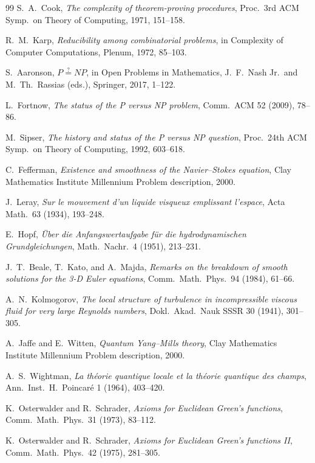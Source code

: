 \documentclass[11pt,a4paper]{amsart}
\theoremstyle{plain}
\theoremstyle{definition}
\begin{document}
\begin{thebibliography}{99}
 S.~A.~Cook, \emph{The complexity of theorem-proving
procedures}, Proc.~3rd ACM Symp.~on Theory of Computing, 1971, 151--158.

 R.~M.~Karp, \emph{Reducibility among combinatorial
problems}, in Complexity of Computer Computations, Plenum, 1972, 85--103.

 S.~Aaronson, \emph{$P\stackrel{?}{=}NP$}, in Open
Problems in Mathematics, J.~F.~Nash Jr.~and M.~Th.~Rassias (eds.),
Springer, 2017, 1--122.

 L.~Fortnow, \emph{The status of the P versus NP
problem}, Comm.~ACM 52 (2009), 78--86.

 M.~Sipser, \emph{The history and status of the P
versus NP question}, Proc.~24th ACM Symp.~on Theory of Computing, 1992,
603--618.

 C.~Fefferman, \emph{Existence and smoothness of
the Navier--Stokes equation}, Clay Mathematics Institute Millennium
Problem description, 2000.

 J.~Leray, \emph{Sur le mouvement d'un liquide
visqueux emplissant l'espace}, Acta Math.~63 (1934), 193--248.

 E.~Hopf, \emph{\"Uber die Anfangswertaufgabe f\"ur
die hydrodynamischen Grundgleichungen}, Math.~Nachr.~4 (1951), 213--231.

 J.~T.~Beale, T.~Kato, and A.~Majda, \emph{Remarks on
the breakdown of smooth solutions for the 3-D Euler equations},
Comm.~Math.~Phys.~94 (1984), 61--66.

 A.~N.~Kolmogorov, \emph{The local structure of
turbulence in incompressible viscous fluid for very large Reynolds
numbers}, Dokl.~Akad.~Nauk SSSR 30 (1941), 301--305.

 A.~Jaffe and E.~Witten, \emph{Quantum Yang--Mills
theory}, Clay Mathematics Institute Millennium Problem description, 2000.

 A.~S.~Wightman, \emph{La th\'eorie quantique
locale et la th\'eorie quantique des champs}, Ann.~Inst.~H.~Poincar\'e 1
(1964), 403--420.

 K.~Osterwalder and R.~Schrader, \emph{Axioms
for Euclidean Green's functions}, Comm.~Math.~Phys.~31 (1973), 83--112.

 K.~Osterwalder and R.~Schrader, \emph{Axioms
for Euclidean Green's functions II}, Comm.~Math.~Phys.~42 (1975),
281--305.


\end{thebibliography}
\end{document}
